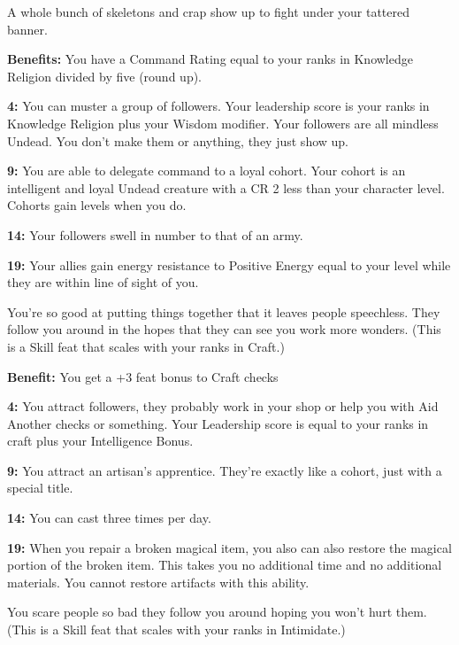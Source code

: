 
A whole bunch of skeletons and crap show up to fight under your tattered banner.

\textbf{Benefits:} You have a Command Rating equal to your ranks in Knowledge Religion divided by five (round up).

\textbf{4:} You can muster a group of followers. Your leadership score is your ranks in Knowledge Religion plus your Wisdom modifier. Your followers are all mindless Undead. You don't make them or anything, they just show up.

\textbf{9:} You are able to delegate command to a loyal cohort. Your cohort is an intelligent and loyal Undead creature with a CR 2 less than your character level. Cohorts gain levels when you do.

\textbf{14:} Your followers swell in number to that of an army.

\textbf{19:} Your allies gain energy resistance to Positive Energy equal to your level while they are within line of sight of you.


You're so good at putting things together that it leaves people speechless. They follow you around in the hopes that they can see you work more wonders. (This is a Skill feat that scales with your ranks in Craft.)

\textbf{Benefit:} You get a +3 feat bonus to Craft checks

\textbf{4:} You attract followers, they probably work in your shop or help you with Aid Another checks or something. Your Leadership score is equal to your ranks in craft plus your Intelligence Bonus.

\textbf{9:} You attract an artisan's apprentice. They're exactly like a cohort, just with a special title.

\textbf{14:} You can cast  three times per day.

\textbf{19:} When you repair a broken magical item, you also can also restore the magical portion of the broken item. This takes you no additional time and no additional materials. You cannot restore artifacts with this ability.


You scare people so bad they follow you around hoping you won't hurt them. (This is a Skill feat that scales with your ranks in Intimidate.)

